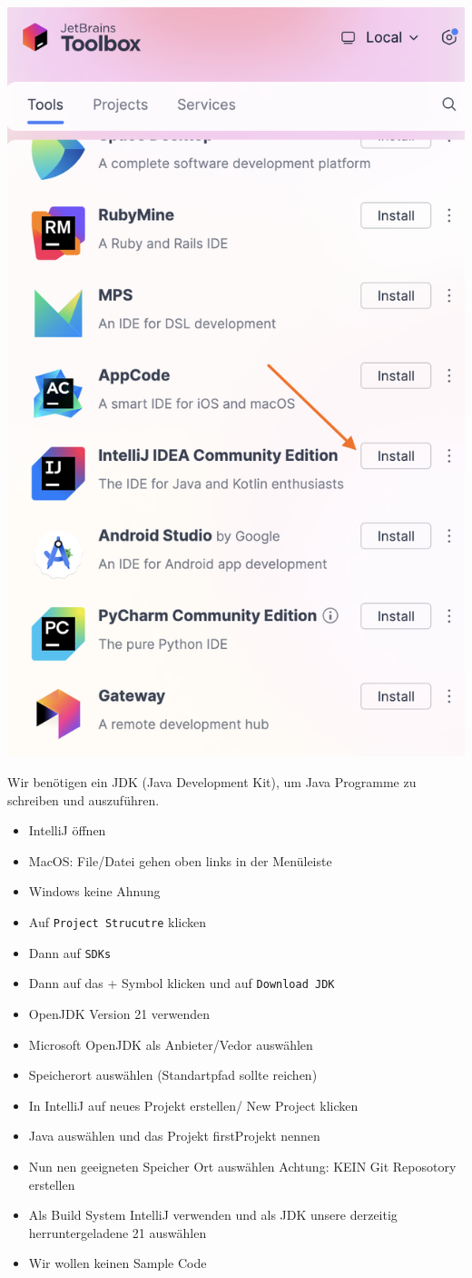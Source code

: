 \documentclass{../../sheet}
\begin{document}
\includegraphics[width=0.5\linewidth]{../img/IntelliJDownload.png}

\newpage

Wir benötigen ein JDK (Java Development Kit), um Java Programme zu schreiben und
auszuführen.
\begin{itemize}
  \item IntelliJ öffnen
  \item MacOS: File/Datei gehen oben links in der Menüleiste
  \item Windows keine Ahnung
  \item Auf \texttt{Project Strucutre} klicken
  \item Dann auf \texttt{SDKs}
  \item Dann auf das + Symbol klicken und auf \texttt{Download JDK}
  \item OpenJDK Version 21 verwenden
  \item Microsoft OpenJDK als Anbieter/Vedor auswählen
  \item Speicherort auswählen (Standartpfad sollte reichen)
\end{itemize}

\newpage

\begin{itemize}
  \item In IntelliJ auf neues Projekt erstellen/ New Project klicken
  \item Java auswählen und das Projekt firstProjekt nennen
  \item Nun nen geeigneten Speicher Ort auswählen Achtung: KEIN Git Reposotory erstellen
  \item Als Build System IntelliJ verwenden und als JDK unsere derzeitig herruntergeladene 21 auswählen
  \item Wir wollen keinen Sample Code
\end{itemize}
\end{document}
